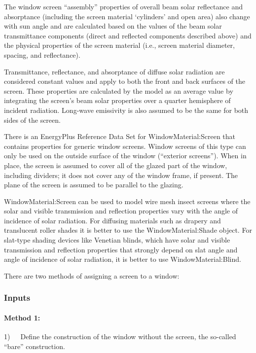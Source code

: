 The window screen ``assembly'' properties of overall beam solar reflectance and absorptance (including the screen material `cylinders' and open area) also change with sun angle and are calculated based on the values of the beam solar transmittance components (direct and reflected components described above) and the physical properties of the screen material (i.e., screen material diameter, spacing, and reflectance).

Transmittance, reflectance, and absorptance of diffuse solar radiation are considered constant values and apply to both the front and back surfaces of the screen. These properties are calculated by the model as an average value by integrating the screen's beam solar properties over a quarter hemisphere of incident radiation. Long-wave emissivity is also assumed to be the same for both sides of the screen.

There is an EnergyPlus Reference Data Set for WindowMaterial:Screen that contains properties for generic window screens. Window screens of this type can only be used on the outside surface of the window (``exterior screens''). When in place, the screen is assumed to cover all of the glazed part of the window, including dividers; it does not cover any of the window frame, if present. The plane of the screen is assumed to be parallel to the glazing.

WindowMaterial:Screen can be used to model wire mesh insect screens where the solar and visible transmission and reflection properties vary with the angle of incidence of solar radiation. For diffusing materials such as drapery and translucent roller shades it is better to use the WindowMaterial:Shade object. For slat-type shading devices like Venetian blinds, which have solar and visible transmission and reflection properties that strongly depend on slat angle and angle of incidence of solar radiation, it is better to use WindowMaterial:Blind.

There are two methods of assigning a screen to a window:

\subsubsection{Inputs}\label{inputs-25-003}

\paragraph{Method 1:}\label{method-1-2}

1)~~~Define the construction of the window without the screen, the so-called ``bare'' construction.

